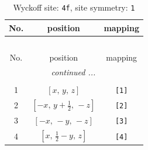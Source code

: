 \documentclass[fleqn,8pt]{jsarticle}
\begin{document}
\renewcommand{\arraystretch}{1.2}
\begin{longtable}{ccc}
\caption{Wyckoff site: {\tt 4f}, site symmetry: {\tt 1}}
 \\
 \hline \hline
No. & position & mapping \\ \hline \endfirsthead

\multicolumn{2}{l}{\tablename\ \thetable{}} \\
 \hline \hline
No. & position & mapping \\ \hline \endhead

 \hline \hline
\multicolumn{2}{r}{\footnotesize\it continued ...} \\ \endfoot

 \hline \hline
\multicolumn{2}{r}{} \\ \endlastfoot

1 & $\left[ x,\, y,\, z \right]$ & {\tt [1]} \\ \hline
2 & $\left[ - x,\, y + \frac{1}{2},\, - z \right]$ & {\tt [2]} \\ \hline
3 & $\left[ - x,\, - y,\, - z \right]$ & {\tt [3]} \\ \hline
4 & $\left[ x,\, \frac{1}{2} - y,\, z \right]$ & {\tt [4]} \\
\end{longtable}
\end{document}
